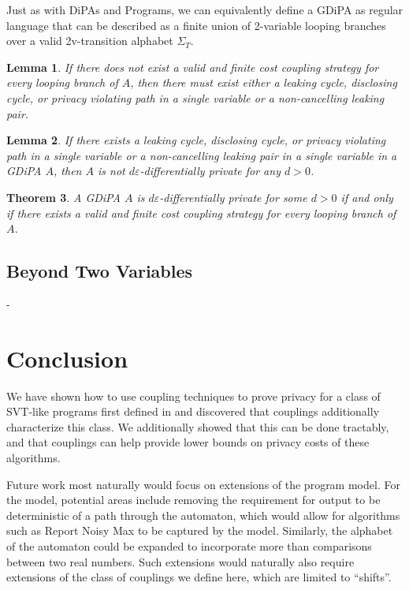 \documentclass[12pt]{article}
\newtheorem{thm}{Theorem}[section]
\newtheorem{lemma}[thm]{Lemma}
\theoremstyle{definition}
\begin{document}
Just as with DiPAs and Programs, we can equivalently define a GDiPA as regular language that can be described as a finite union of 2-variable looping branches over a valid 2v-transition alphabet $\Sigma_T$. 


\begin{lemma}
    If there does not exist a valid and finite cost coupling strategy for every looping branch of $A$, then there must exist either a leaking cycle, disclosing cycle, or privacy violating path in a single variable or a non-cancelling leaking pair. 
\end{lemma}

\begin{lemma}
    If there exists a leaking cycle, disclosing cycle, or privacy violating path in a single variable or a non-cancelling leaking pair in a single variable in a GDiPA $A$, then $A$ is not $d\varepsilon$-differentially private for any $d>0$. 
\end{lemma}

\begin{thm}
    A GDiPA $A$ is $d\varepsilon$-differentially private for some $d>0$ if and only if there exists a valid and finite cost coupling strategy for every looping branch of $A$. 
\end{thm}

\subsection{Beyond Two Variables}

- 

\section{Conclusion}
We have shown how to use coupling techniques to prove privacy for a class of SVT-like programs first defined in \cite{chadhaLinearTimeDecidability2021} and discovered that couplings additionally characterize this class. We additionally showed that this can be done tractably, and that couplings can help provide lower bounds on privacy costs of these algorithms. 

Future work most naturally would focus on extensions of the program model. For the model, potential areas include removing the requirement for output to be deterministic of a path through the automaton, which would allow for algorithms such as Report Noisy Max to be captured by the model. Similarly, the alphabet of the automaton could be expanded to incorporate more than comparisons between two real numbers. 
Such extensions would naturally also require extensions of the class of couplings we define here, which are limited to ``shifts''. 
\end{document}
